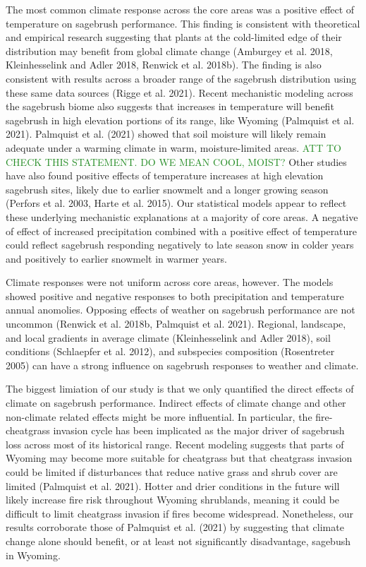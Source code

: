 \documentclass[
  12pt,
]{article}
\begin{document}
The most common climate response across the core areas was a positive effect of temperature on sagebrush performance.
This finding is consistent with theoretical and empirical research suggesting that plants at the cold-limited edge of their distribution may benefit from global climate change (Amburgey et al. 2018, Kleinhesselink and Adler 2018, Renwick et al. 2018b).
The finding is also consistent with results across a broader range of the sagebrush distribution using these same data sources (Rigge et al. 2021).
Recent mechanistic modeling across the sagebrush biome also suggests that increases in temperature will benefit sagebrush in high elevation portions of its range, like Wyoming (Palmquist et al. 2021).
Palmquist et al. (2021) showed that soil moisture will likely remain adequate under a warming climate in warm, moisture-limited areas. \textcolor{ForestGreen}{ATT TO CHECK THIS STATEMENT. DO WE MEAN COOL, MOIST?}
Other studies have also found positive effects of temperature increases at high elevation sagebrush sites, likely due to earlier snowmelt and a longer growing season (Perfors et al. 2003, Harte et al. 2015).
Our statistical models appear to reflect these underlying mechanistic explanations at a majority of core areas.
A negative of effect of increased precipitation combined with a positive effect of temperature could reflect sagebrush responding negatively to late season snow in colder years and positively to earlier snowmelt in warmer years.

Climate responses were not uniform across core areas, however.
The models showed positive and negative responses to both precipitation and temperature annual anomolies.
Opposing effects of weather on sagebrush performance are not uncommon (Renwick et al. 2018b, Palmquist et al. 2021).
Regional, landscape, and local gradients in average climate (Kleinhesselink and Adler 2018), soil conditions (Schlaepfer et al. 2012), and subspecies composition (Rosentreter 2005) can have a strong influence on sagebrush responses to weather and climate.

The biggest limiation of our study is that we only quantified the direct effects of climate on sagebrush performance.
Indirect effects of climate change and other non-climate related effects might be more influential.
In particular, the fire-cheatgrass invasion cycle has been implicated as the major driver of sagebrush loss across most of its historical range.
Recent modeling suggests that parts of Wyoming may become more suitable for cheatgrass but that cheatgrass invasion could be limited if disturbances that reduce native grass and shrub cover are limited (Palmquist et al. 2021).
Hotter and drier conditions in the future will likely increase fire risk throughout Wyoming shrublands, meaning it could be difficult to limit cheatgrass invasion if fires become widespread.
Nonetheless, our results corroborate those of Palmquist et al. (2021) by suggesting that climate change alone should benefit, or at least not significantly disadvantage, sagebush in Wyoming.
\end{document}
